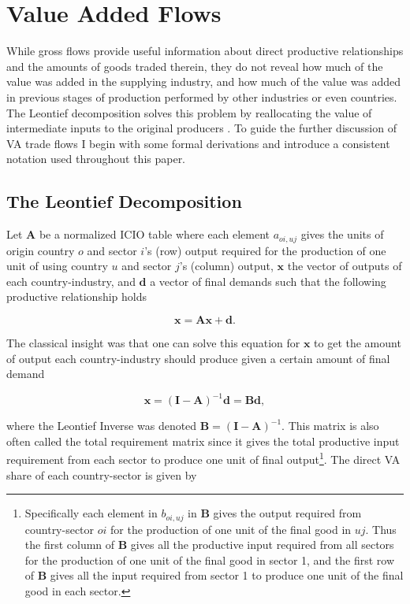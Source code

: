 \documentclass[a4paper]{article}
\begin{document}
\section{Value Added Flows}
While gross flows provide useful information about direct productive relationships and the amounts of goods traded therein, they do not reveal how much of the value was added in the supplying industry, and how much of the value was added in previous stages of production performed by other industries or even countries. %
The Leontief decomposition solves this problem by reallocating the value of intermediate inputs to the original producers \citep{Kummritz2014}. %
To guide the further discussion of VA trade flows I begin with some formal derivations and introduce a consistent notation used throughout this paper. 

\subsection{The Leontief Decomposition}

Let $\textbf{A}$ be a normalized ICIO table where each element $a_{oi,uj}$ gives the units of origin country $o$ and sector $i$'s (row) output required for the production of one unit of using country $u$ and sector $j$'s (column) output, $\textbf{x}$ the vector of outputs of each country-industry, and $\textbf{d}$ a vector of final demands such that the following productive relationship holds

\begin{equation}
\textbf{x} = \textbf{A}\textbf{x} + \textbf{d}.
\end{equation}

The classical \citet{leontief1936quantitative} insight was that one can solve this equation for $\textbf{x}$ to get the amount of output each country-industry should produce given a certain amount of final demand

\begin{equation} \label{eq:leontief}
\textbf{x} = (\textbf{I}-\textbf{A})^{-1} \textbf{d} = \textbf{B}\textbf{d},
\end{equation}

\noindent where the Leontief Inverse was denoted $\textbf{B} = (\textbf{I}-\textbf{A})^{-1}$. This matrix is also often called the total requirement matrix since it gives the total productive input requirement from each sector to produce one unit of final output\footnote{Specifically each element in $b_{oi,uj}$ in \textbf{B} gives the output required from country-sector $oi$ for the production of one unit of the final good in $uj$. Thus the first column of \textbf{B} gives all the productive input required from all sectors for the production of one unit of the final good in sector 1, and the first row of \textbf{B} gives all the input required from sector 1 to produce one unit of the final good in each sector.}. The direct VA share of each country-sector is given by
\end{document}
